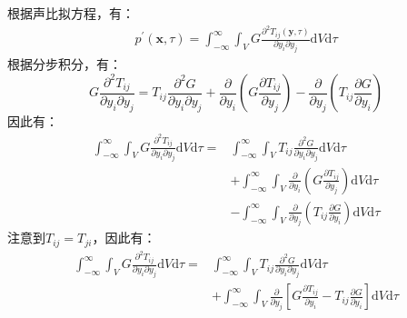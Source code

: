 \begin{enumerate}
    根据声比拟方程，有：
    \begin{equation}
        \begin{aligned}
            p^{\prime}(\mathbf{x},\tau) 
            = \int_{-\infty}^{\infty} \int_{V} G \frac{\partial^{2} T_{i j}(\mathbf{y},\tau)}{\partial y_{i} \partial y_{j}} \mathrm{d} V \mathrm{d} \tau
        \end{aligned}
    \end{equation}
    根据分步积分，有：
    \begin{equation}
        G \frac{\partial^{2} T_{i j}}{\partial y_{i} \partial y_{j}}=T_{i j} \frac{\partial^{2} G}{\partial y_{i} \partial y_{j}}+\frac{\partial}{\partial y_{i}}\left(G \frac{\partial T_{i j}}{\partial y_{j}}\right)-\frac{\partial}{\partial y_{j}}\left(T_{i j} \frac{\partial G}{\partial y_{i}}\right)
    \end{equation}
    因此有：
    \begin{equation}
        \begin{aligned}
            \int_{-\infty}^{\infty} \int_{V} G \frac{\partial^{2} T_{i j}}{\partial y_{i} \partial y_{j}} \mathrm{d} V \mathrm{d} \tau =
            & \int_{-\infty}^{\infty} \int_{V} T_{i j} \frac{\partial^{2} G}{\partial y_{i} \partial y_{j}} \mathrm{d} V \mathrm{d} \tau \\
            & + \int_{-\infty}^{\infty} \int_{V} \frac{\partial}{\partial y_{i}}\left(G \frac{\partial T_{i j}}{\partial y_{j}}\right) \mathrm{d} V \mathrm{d} \tau \\
            & - \int_{-\infty}^{\infty} \int_{V} \frac{\partial}{\partial y_{j}}\left(T_{i j} \frac{\partial G}{\partial y_{i}}\right) \mathrm{d} V \mathrm{d} \tau
        \end{aligned}
    \end{equation}
    注意到$T_{i j} = T_{j i}$，因此有：
    \begin{equation}
        \begin{aligned}
            \int_{-\infty}^{\infty} \int_{V} G \frac{\partial^{2} T_{i j}}{\partial y_{i} \partial y_{j}} \mathrm{d} V \mathrm{d} \tau =
            & \int_{-\infty}^{\infty} \int_{V} T_{i j} \frac{\partial^{2} G}{\partial y_{i} \partial y_{j}} \mathrm{d} V \mathrm{d} \tau \\
            & + \int_{-\infty}^{\infty} \int_{V} \frac{\partial}{\partial y_{j}}\left[G \frac{\partial T_{i j}}{\partial y_{i}}
              - T_{i j} \frac{\partial G}{\partial y_{i}}\right] \mathrm{d} V \mathrm{d} \tau
        \end{aligned}

\end{equation}
\end{enumerate}
